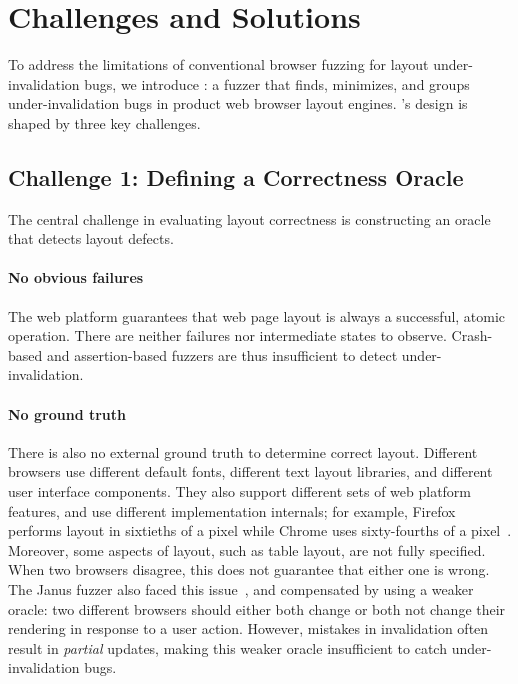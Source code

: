 \section{Challenges and Solutions}

To address the limitations of conventional browser fuzzing
  for layout under-invalidation bugs, we introduce \toolname:
  a fuzzer that finds, minimizes, and groups under-invalidation bugs
  in product web browser layout engines.
\toolname's design is shaped by three key challenges.

\subsection{Challenge 1: Defining a Correctness Oracle}

The central challenge in evaluating layout correctness is
  constructing an oracle that detects layout defects.

\paragraph{No obvious failures}
The web platform guarantees that web page layout
  is always a successful, atomic operation.
There are neither failures nor intermediate states to observe.
Crash-based and assertion-based fuzzers are thus
  insufficient to detect under-invalidation.

\paragraph{No ground truth}
There is also no external ground truth to determine correct layout.
Different browsers use different default fonts,
  different text layout libraries,
  and different user interface components.
They also support different sets of web platform features,
  and use different implementation internals;
  for example, Firefox performs layout in sixtieths of a pixel
  while Chrome uses sixty-fourths of a pixel~\cite{cassius}.
Moreover, some aspects of layout, such as table layout,
  are not fully specified.
When two browsers disagree,
  this does not guarantee that either one is wrong.
The Janus fuzzer also faced this issue~\cite{zhou2025janus},
  and compensated by using a weaker oracle:
  two different browsers should either both change
  or both not change their rendering in response to a user action.
However, mistakes in invalidation often result in \emph{partial} updates,
  making this weaker oracle insufficient to catch under-invalidation bugs.

